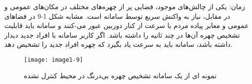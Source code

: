 زمان: یکی از چالش‌های موجود، فضایی پر از چهره‌های مختلف در مکان‌های عمومی و در مقابل، نیاز به واکنش سریع توسط سامانه است. مشابه شکل 1-9 در فضاهای عمومی و معابر پیاده مردم با سرعت از کنار دوربین عبور می-کنند و سامانه باید قابلیت تشخیص چهره آن‌ها در چند ثانیه را داشته باشد. اگر کاربر سامانه با افراد جدید دیدار داشته باشد، سامانه باید به سرعت یاد بگیرد که چهره افراد جدید را تشخیص دهد. 
\begin{figure}[!h]
\centering
\texttt{[image: image1-9]}
\caption{نمونه ای از یک سامانه تشخیص چهره بی‌درنگ در محیط کنترل نشده \cite{ref13}}\label{image1-9}
\end{figure}
 